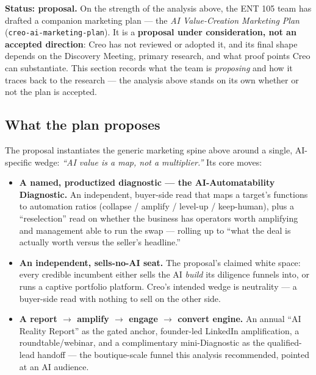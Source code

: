 \documentclass[11pt]{article}
\begin{document}
\begin{takeaway}
\textbf{Status: proposal.} On the strength of the analysis above, the ENT 105 team has
drafted a companion marketing plan --- the \emph{AI Value-Creation Marketing Plan}
(\texttt{creo-ai-marketing-plan}). It is a \textbf{proposal under consideration, not an
accepted direction}: Creo has not reviewed or adopted it, and its final shape depends on the
Discovery Meeting, primary research, and what proof points Creo can substantiate. This
section records what the team is \emph{proposing} and how it traces back to the research ---
the analysis above stands on its own whether or not the plan is accepted.
\end{takeaway}

\subsection{What the plan proposes}
The proposal instantiates the generic marketing spine above around a single, AI-specific
wedge: \emph{``AI value is a map, not a multiplier.''} Its core moves:
\begin{itemize}
  \item \textbf{A named, productized diagnostic --- the AI-Automatability Diagnostic.} An
  independent, buyer-side read that maps a target's functions to automation ratios
  (collapse / amplify / level-up / keep-human), plus a ``reselection'' read on whether the
  business has operators worth amplifying and management able to run the swap --- rolling up
  to ``what the deal is actually worth versus the seller's headline.''
  \item \textbf{An independent, sells-no-AI seat.} The proposal's claimed white space: every
  credible incumbent either sells the AI \emph{build} its diligence funnels into, or runs a
  captive portfolio platform. Creo's intended wedge is neutrality --- a buyer-side read with
  nothing to sell on the other side.
  \item \textbf{A report $\rightarrow$ amplify $\rightarrow$ engage $\rightarrow$ convert
  engine.} An annual ``AI Reality Report'' as the gated anchor, founder-led LinkedIn
  amplification, a roundtable/webinar, and a complimentary mini-Diagnostic as the
  qualified-lead handoff --- the boutique-scale funnel this analysis recommended, pointed at
  an AI audience.
\end{itemize}
\end{document}
